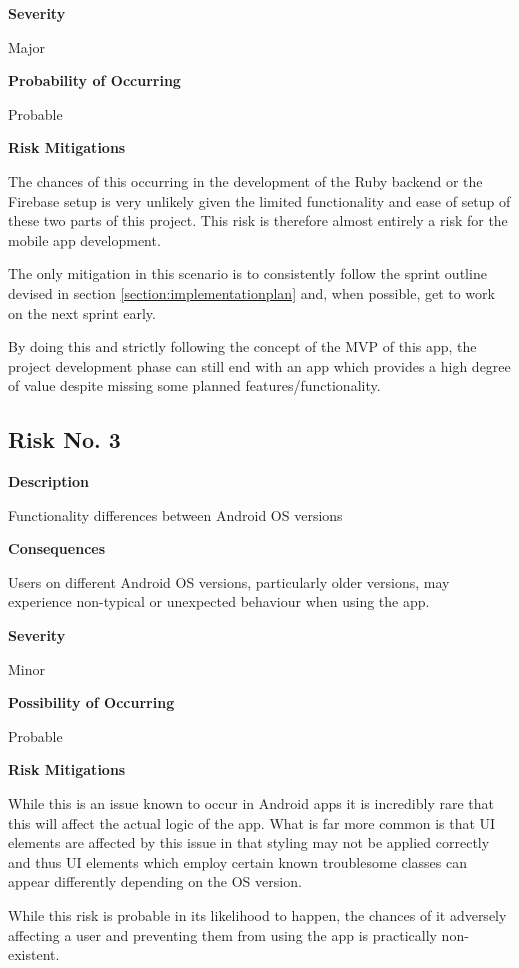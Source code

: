 \textbf{Severity}

Major

\textbf{Probability of Occurring}

Probable

\textbf{Risk Mitigations}

The chances of this occurring in the development of the Ruby backend or the Firebase setup is very unlikely given the limited functionality and ease of setup of these two parts of this project. This risk is therefore almost entirely a risk for the mobile app development.

The only mitigation in this scenario is to consistently follow the sprint outline devised in section \ref{section:implementationplan} and, when possible, get to work on the next sprint early.

By doing this and strictly following the concept of the MVP of this app, the project development phase can still end with an app which provides a high degree of value despite missing some planned features/functionality.

\subsection{Risk No. 3}

\textbf{Description}

Functionality differences between Android OS versions

\textbf{Consequences}

Users on different Android OS versions, particularly older versions, may experience non-typical or unexpected behaviour when using the app.

\textbf{Severity}

Minor

\textbf{Possibility of Occurring}

Probable

\textbf{Risk Mitigations}

While this is an issue known to occur in Android apps it is incredibly rare that this will affect the actual logic of the app. What is far more common is that UI elements are affected by this issue in that styling may not be applied correctly and thus UI elements which employ certain known troublesome classes can appear differently depending on the OS version.

While this risk is probable in its likelihood to happen, the chances of it adversely affecting  a user and preventing them from using the app is practically non-existent. 

